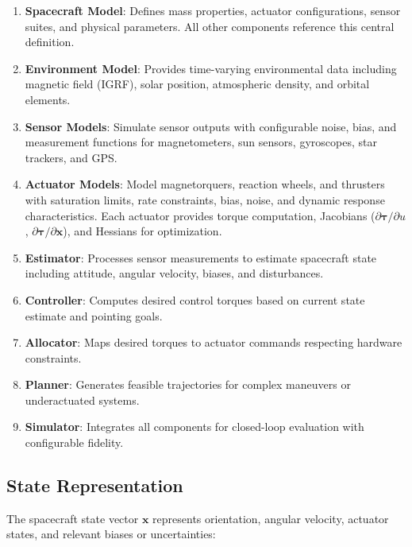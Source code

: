 \documentclass[conference]{IEEEtran}
\begin{document}
\begin{enumerate}
    \item \textbf{Spacecraft Model}: Defines mass properties, actuator configurations, sensor suites, and physical parameters. All other components reference this central definition.

    \item \textbf{Environment Model}: Provides time-varying environmental data including magnetic field (IGRF), solar position, atmospheric density, and orbital elements.

    \item \textbf{Sensor Models}: Simulate sensor outputs with configurable noise, bias, and measurement functions for magnetometers, sun sensors, gyroscopes, star trackers, and GPS.

    \item \textbf{Actuator Models}: Model magnetorquers, reaction wheels, and thrusters with saturation limits, rate constraints, bias, noise, and dynamic response characteristics. Each actuator provides torque computation, Jacobians ($\partial\boldsymbol{\tau}/\partial u$, $\partial\boldsymbol{\tau}/\partial\mathbf{x}$), and Hessians for optimization.

    \item \textbf{Estimator}: Processes sensor measurements to estimate spacecraft state including attitude, angular velocity, biases, and disturbances.

    \item \textbf{Controller}: Computes desired control torques based on current state estimate and pointing goals.

    \item \textbf{Allocator}: Maps desired torques to actuator commands respecting hardware constraints.

    \item \textbf{Planner}: Generates feasible trajectories for complex maneuvers or underactuated systems.

    \item \textbf{Simulator}: Integrates all components for closed-loop evaluation with configurable fidelity.
\end{enumerate}

\subsection{State Representation}\label{subsec:state}

The spacecraft state vector $\mathbf{x}$ represents orientation, angular velocity, actuator states, and relevant biases or uncertainties:
\end{document}
